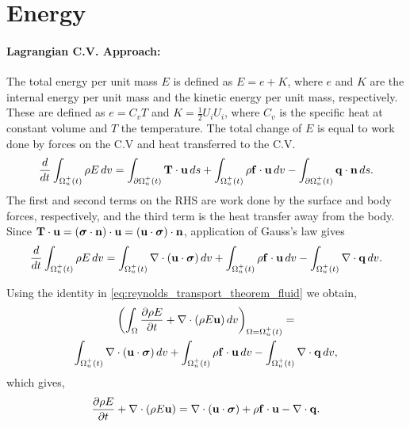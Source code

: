 \documentclass[oneside,a4paper,11pt]{report}
\begin{document}
\section{Energy}

\paragraph{Lagrangian C.V. Approach:}
The total energy per unit mass $E$ is defined as $E = e + K$, where $e$ and $K$ are the internal energy per unit mass and the kinetic energy per unit mass, respectively. These are defined as $e = C_vT$ and $K = \frac{1}{2} U_i U_i$, where $C_v$ is the specific heat at constant volume and $T$ the temperature. The total change of $E$ is equal to work done by forces on the C.V and heat transferred to the C.V.
\begin{equation}
\frac{d}{dt}\int_{\Omega^+_u(t)} \rho E\,dv = \int_{\partial \Omega^+_u(t)} \mathbf{T} \cdot \mathbf{u} \,ds + \int_{\Omega^+_u(t)} \rho \mathbf{f} \cdot \mathbf{u} \,dv - \int_{\partial \Omega^+_u(t)} \mathbf{q} \cdot \mathbf{n} \, ds.
\end{equation}
The first and second terms on the RHS are work done by the surface and body forces, respectively, and the third term is the heat transfer away from the body. Since $\mathbf{T} \cdot \mathbf{u} = (\boldsymbol{\sigma} \cdot \mathbf{n}) \cdot \mathbf{u} = (\mathbf{u} \cdot \boldsymbol{\sigma}) \cdot \mathbf{n}$, application of Gauss's law gives
\begin{equation}
\frac{d}{dt}\int_{\Omega^+_u(t)} \rho E\,dv = \int_{\Omega^+_u(t)} \nabla \cdot (\mathbf{u} \cdot \boldsymbol{\sigma}) \,dv + \int_{\Omega^+_u(t)} \rho \mathbf{f} \cdot \mathbf{u} \,dv - \int_{\Omega^+_u(t)} \nabla \cdot \mathbf{q} \, dv.
\end{equation}

Using the identity in \cref{eq:reynolds_transport_theorem_fluid} we obtain,
\begin{multline}
\left(\int_{\Omega} \frac{\partial \rho E}{\partial t} +\nabla \cdot (\rho E \mathbf{u}) \,dv \right)_{\Omega = \Omega^+_u(t)} =\\ 
\int_{\Omega^+_u(t)}\nabla\cdot(\mathbf{u} \cdot \boldsymbol{\sigma} )\,dv
+ \int_{\Omega^+_u(t)} \rho \mathbf{f} \cdot \mathbf{u} \,dv
- \int_{\Omega^+_u(t)} \nabla\cdot\mathbf{q}\,dv,
\end{multline}
which gives,
\begin{equation}
\frac{\partial \rho E}{\partial t} +\nabla \cdot (\rho E \mathbf{u} ) = \nabla\cdot(\mathbf{u} \cdot \boldsymbol{\sigma} ) + \rho \mathbf{f} \cdot \mathbf{u} - \nabla \cdot \mathbf{q}.
\end{equation}
\end{document}
